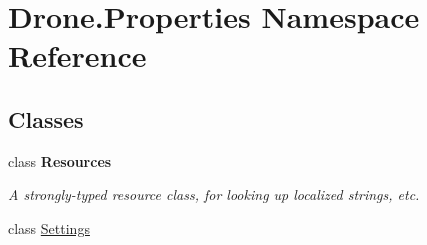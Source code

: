 \hypertarget{namespace_drone_1_1_properties}{}\section{Drone.\+Properties Namespace Reference}
\label{namespace_drone_1_1_properties}
\subsection*{Classes}
\begin{DoxyCompactItemize}
\item 
class {\bfseries Resources}
\begin{DoxyCompactList}\small\item\em A strongly-\/typed resource class, for looking up localized strings, etc. \end{DoxyCompactList}\item 
class \hyperlink{class_drone_1_1_properties_1_1_settings}{Settings}
\end{DoxyCompactItemize}
